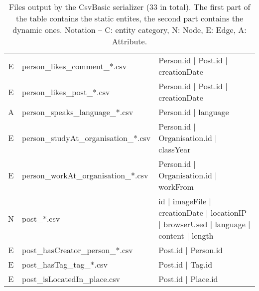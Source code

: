 \begin{table}[htb]
\begin{tabular}{|c|p{4.6cm}|p{9.8cm}|}
        E                       & person\_likes\_comment\_*.csv           & Person.id | Post.id | creationDate                                                      \\
        E                       & person\_likes\_post\_*.csv              & Person.id | Post.id | creationDate                                                      \\
        A                       & person\_speaks\_language\_*.csv         & Person.id | language                                                                    \\
        E                       & person\_studyAt\_organisation\_*.csv    & Person.id | Organisation.id | classYear                                                 \\
        E                       & person\_workAt\_organisation\_*.csv     & Person.id | Organisation.id | workFrom                                                  \\
        \hline
        N                       & post\_*.csv                             & id | imageFile | creationDate | locationIP | browserUsed | language | content | length  \\
        E                       & post\_hasCreator\_person\_*.csv         & Post.id | Person.id                                                                     \\
        E                       & post\_hasTag\_tag\_*.csv                & Post.id | Tag.id                                                                        \\
        E                       & post\_isLocatedIn\_place.csv            & Post.id | Place.id                                                                      \\
        \hline
    \end{tabular}
    \caption{Files output by the CsvBasic serializer (33 in total). The first part of the table contains the static entites, the second part contains the dynamic ones. Notation -- C: entity category, N: Node, E: Edge, A: Attribute.}
    \label{table:csv_basic}
\end{table}
